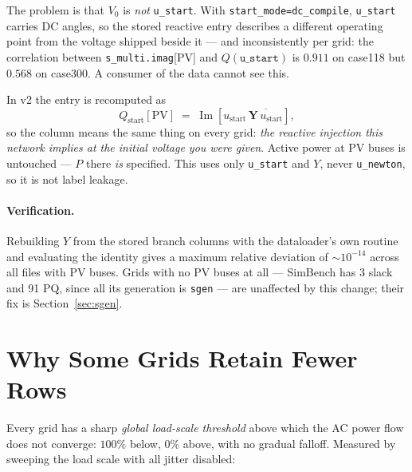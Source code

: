 \documentclass{article}
\begin{document}
\noindent
The problem is that $V_0$ is \emph{not} \texttt{u\_start}.  With
\texttt{start\_mode=dc\_compile}, \texttt{u\_start} carries DC angles, so the
stored reactive entry describes a different operating point from the voltage
shipped beside it --- and inconsistently per grid: the correlation between
\texttt{s\_multi.imag}[PV] and $Q(\texttt{u\_start})$ is $0.911$ on case118 but
$0.568$ on case300.  A consumer of the data cannot see this.

In v2 the entry is recomputed as
\[
Q_{\text{start}}[\text{PV}] \;=\; \operatorname{Im}\!\left[u_{\text{start}} \,
\overline{\mathbf{Y}\,u_{\text{start}}}\right],
\]
so the column means the same thing on every grid: \emph{the reactive injection
this network implies at the initial voltage you were given}.  Active power at PV
buses is untouched --- $P$ there \emph{is} specified.  This uses only
\texttt{u\_start} and $Y$, never \texttt{u\_newton}, so it is not label leakage.

\paragraph{Verification.}  Rebuilding $Y$ from the stored branch columns with
the dataloader's own routine and evaluating the identity gives a maximum
relative deviation of $\sim\!10^{-14}$ across all files with PV buses.
Grids with no PV buses at all --- SimBench has 3 slack and 91 PQ, since all its
generation is \texttt{sgen} --- are unaffected by this change; their fix is
Section~\ref{sec:sgen}.


\section{Why Some Grids Retain Fewer Rows}
\label{sec:cliff}

Every grid has a sharp \emph{global load-scale threshold} above which the AC
power flow does not converge: $100\%$ below, $0\%$ above, with no gradual
falloff.  Measured by sweeping the load scale with all jitter disabled:
\end{document}
